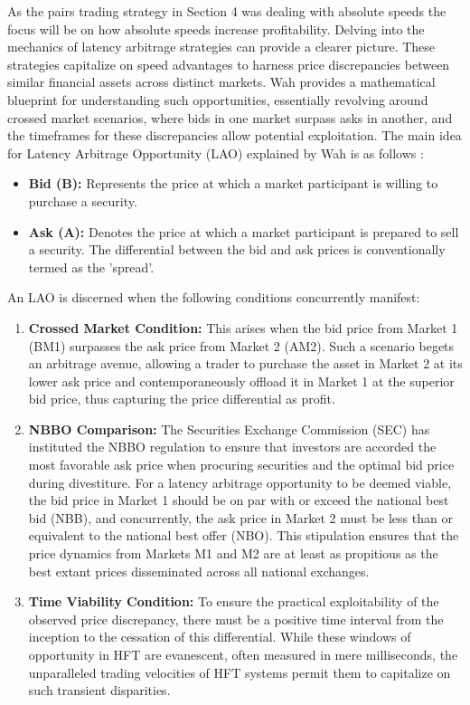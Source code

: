 \documentclass{article}
\theoremstyle{break}
\begin{document}
As the pairs trading strategy in Section 4 was dealing with absolute speeds the focus will be on how absolute speeds increase profitability. Delving into the mechanics of latency arbitrage strategies can provide a clearer picture. These strategies capitalize on speed advantages to harness price discrepancies between similar financial assets across distinct markets. Wah \cite{wah2013} provides a mathematical blueprint for understanding such opportunities, essentially revolving around crossed market scenarios, where bids in one market surpass asks in another, and the timeframes for these discrepancies allow potential exploitation. The main idea for Latency Arbitrage Opportunity (LAO) explained by Wah is as follows \cite{wah2013}:


\begin{itemize}
    \item \textbf{Bid (B):} Represents the price at which a market participant is willing to purchase a security.
    \item \textbf{Ask (A):} Denotes the price at which a market participant is prepared to sell a security. The differential between the bid and ask prices is conventionally termed as the 'spread'.
\end{itemize}


An LAO is discerned when the following conditions concurrently manifest:
\begin{enumerate}
    \item \textbf{Crossed Market Condition:} This arises when the bid price from Market 1 (BM1) surpasses the ask price from Market 2 (AM2). Such a scenario begets an arbitrage avenue, allowing a trader to purchase the asset in Market 2 at its lower ask price and contemporaneously offload it in Market 1 at the superior bid price, thus capturing the price differential as profit.
    \item \textbf{NBBO Comparison:} The Securities Exchange Commission (SEC) has instituted the NBBO regulation to ensure that investors are accorded the most favorable ask price when procuring securities and the optimal bid price during divestiture. For a latency arbitrage opportunity to be deemed viable, the bid price in Market 1 should be on par with or exceed the national best bid (NBB), and concurrently, the ask price in Market 2 must be less than or equivalent to the national best offer (NBO). This stipulation ensures that the price dynamics from Markets M1 and M2 are at least as propitious as the best extant prices disseminated across all national exchanges.
    \item \textbf{Time Viability Condition:} To ensure the practical exploitability of the observed price discrepancy, there must be a positive time interval from the inception to the cessation of this differential. While these windows of opportunity in HFT are evanescent, often measured in mere milliseconds, the unparalleled trading velocities of HFT systems permit them to capitalize on such transient disparities.
\end{enumerate}
\end{document}

